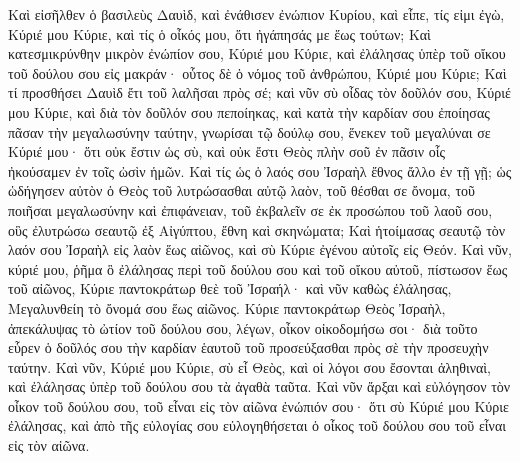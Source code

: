 {\par }{\PP {}Καὶ εἰσῆλθεν ὁ βασιλεὺς Δαυὶδ, καὶ ἐνάθισεν ἐνώπιον Κυρίου, καὶ εἶπε, τίς εἰμι ἐγὼ, Κύριέ μου Κύριε, καὶ τίς ὁ οἶκός μου, ὅτι ἠγάπησάς με ἕως τούτων;
Καὶ κατεσμικρύνθην μικρὸν ἐνώπίον σου, Κύριέ μου Κύριε, καὶ ἐλάλησας ὑπὲρ τοῦ οἴκου τοῦ δούλου σου εἰς μακράν· οὗτος δὲ ὁ νόμος τοῦ ἀνθρώπου, Κύριέ μου Κύριε;
Καὶ τί προσθήσει Δαυὶδ ἔτι τοῦ λαλῆσαι πρὸς σέ; καὶ νῦν σὺ οἶδας τὸν δοῦλόν σου, Κύριέ μου Κύριε,
καὶ διὰ τὸν δοῦλόν σου πεποίηκας, καὶ κατὰ τὴν καρδίαν σου ἐποίησας πᾶσαν τὴν μεγαλωσύνην ταύτην, γνωρίσαι τῷ δούλῳ σου, ἕνεκεν τοῦ μεγαλύναι σε
Κύριέ μου· ὅτι οὐκ ἔστιν ὡς σὺ, καὶ οὐκ ἔστι Θεὸς πλὴν σοῦ ἐν πᾶσιν οἷς ἠκούσαμεν ἐν τοῖς ὠσὶν ἡμῶν.
Καὶ τίς ὡς ὁ λαός σου Ἰσραὴλ ἔθνος ἄλλο ἐν τῇ γῇ; ὡς ὡδήγησεν αὐτὸν ὁ Θεὸς τοῦ λυτρώσασθαι αὐτῷ λαὸν, τοῦ θέσθαι σε ὄνομα, τοῦ ποιῆσαι μεγαλωσύνην καὶ ἐπιφάνειαν, τοῦ ἐκβαλεῖν σε ἐκ προσώπου τοῦ λαοῦ σου, οὓς ἐλυτρώσω σεαυτῷ ἐξ Αἰγύπτου, ἔθνη καὶ σκηνώματα;
Καὶ ἡτοίμασας σεαυτῷ τὸν λαόν σου Ἰσραὴλ εἰς λαὸν ἕως αἰῶνος, καὶ σὺ Κύριε ἐγένου αὐτοῖς εἰς Θεόν.
Καὶ νῦν, κύριέ μου, ῥῆμα ὃ ἐλάλησας περὶ τοῦ δούλου σου καὶ τοῦ οἴκου αὐτοῦ, πίστωσον ἕως τοῦ αἰῶνος, Κύριε παντοκράτωρ θεὲ τοῦ Ἰσραήλ· καὶ νῦν καθὼς ἐλάλησας,
Μεγαλυνθείη τὸ ὄνομά σου ἕως αἰῶνος.
Κύριε παντοκράτωρ Θεὸς Ἰσραὴλ, ἀπεκάλυψας τὸ ὠτίον τοῦ δούλου σου, λέγων, οἶκον οἰκοδομήσω σοι· διὰ τοῦτο εὗρεν ὁ δοῦλός σου τὴν καρδίαν ἑαυτοῦ τοῦ προσεύξασθαι πρὸς σὲ τὴν προσευχὴν ταύτην.
Καὶ νῦν, Κύριέ μου Κύριε, σὺ εἶ Θεὸς, καὶ οἱ λόγοι σου ἔσονται ἀληθιναὶ, καὶ ἐλάλησας ὑπὲρ τοῦ δούλου σου τὰ ἀγαθὰ ταῦτα.
Καὶ νῦν ἄρξαι καὶ εὐλόγησον τὸν οἶκον τοῦ δούλου σου, τοῦ εἶναι εἰς τὸν αἰῶνα ἐνώπιόν σου· ὅτι σὺ Κύριέ μου Κύριε ἐλάλησας, καὶ ἀπὸ τῆς εὐλογίας σου εὐλογηθήσεται ὁ οἶκος τοῦ δούλου σου τοῦ εἶναι εἰς τὸν αἰῶνα.

}
